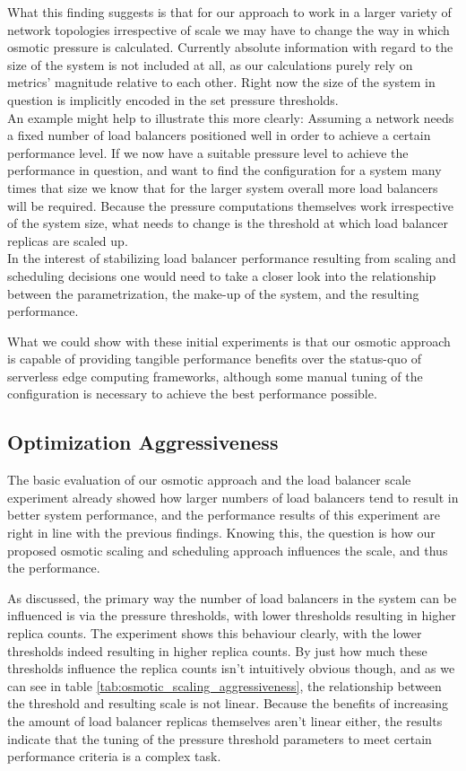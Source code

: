 \documentclass[draft,final]{vutinfth} %
\begin{document}
What this finding suggests is that for our approach to work in a larger variety of network topologies irrespective of scale we may have to change the way in which osmotic pressure is calculated.
Currently absolute information with regard to the size of the system is not included at all, as our calculations purely rely on metrics' magnitude relative to each other.
Right now the size of the system in question is implicitly encoded in the set pressure thresholds.\\
An example might help to illustrate this more clearly: Assuming a network needs a fixed number of load balancers positioned well in order to achieve a certain performance level.
If we now have a suitable pressure level to achieve the performance in question, and want to find the configuration for a system many times that size we know that for the larger system overall more load balancers will be required.
Because the pressure computations themselves work irrespective of the system size, what needs to change is the threshold at which load balancer replicas are scaled up. \\
In the interest of stabilizing load balancer performance resulting from scaling and scheduling decisions one would need to take a closer look into the relationship between the parametrization,  the make-up of the system, and the resulting performance.

What we could show with these initial experiments is that our osmotic approach is capable of providing tangible performance benefits over the status-quo of serverless edge computing frameworks, although some manual tuning of the configuration is necessary to achieve the best performance possible.

\subsection{Optimization Aggressiveness}
The basic evaluation of our osmotic approach and the load balancer scale experiment already showed how larger numbers of load balancers tend to result in better system performance, and the performance results of this experiment are right in line with the previous findings.
Knowing this, the question is how our proposed osmotic scaling and scheduling approach influences the scale, and thus the performance.

As discussed, the primary way the number of load balancers in the system can be influenced is via the pressure thresholds, with lower thresholds resulting in higher replica counts.
The experiment shows this behaviour clearly, with the lower thresholds indeed resulting in higher replica counts.
By just how much these thresholds influence the replica counts isn't intuitively obvious though, and as we can see in table \ref{tab:osmotic_scaling_aggressiveness}, the relationship between the threshold and resulting scale is not linear.
Because the benefits of increasing the amount of load balancer replicas themselves aren't linear either, the results indicate that the tuning of the pressure threshold parameters to meet certain performance criteria is a complex task.
\end{document}

